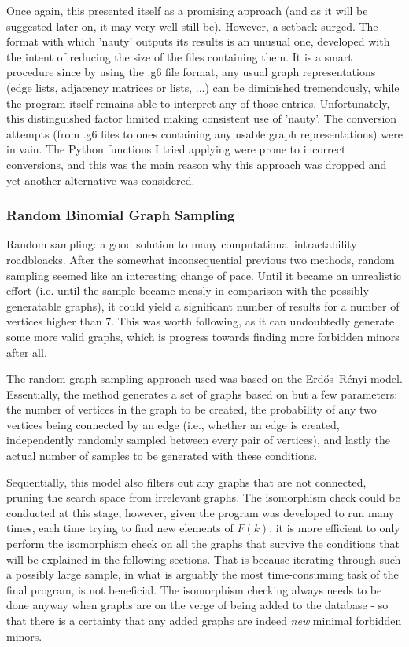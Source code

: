 Once again, this presented itself as a promising approach (and as it will be suggested later on, it may very well still be). However, a setback surged. The format with which 'nauty' outputs its results is an unusual one, developed with the intent of reducing the size of the files containing them. It is a smart procedure since by using the .g6 file format, any usual graph representations (edge lists, adjacency matrices or lists, ...) can be diminished tremendously, while the program itself remains able to interpret any of those entries. Unfortunately, this distinguished factor limited making consistent use of 'nauty'. The conversion attempts (from .g6 files to ones containing any usable graph representations) were in vain. The Python functions I tried applying were prone to incorrect conversions, and this was the main reason why this approach was dropped and yet another alternative was considered.

\subsubsection{Random Binomial Graph Sampling}
Random sampling: a good solution to many computational intractability roadbloacks. After the somewhat inconsequential previous two methods, random sampling seemed like an interesting change of pace. Until it became an unrealistic effort (i.e. until the sample became measly in comparison with the possibly generatable graphs), it could yield a significant number of results for a number of vertices higher than 7. This was worth following, as it can undoubtedly generate some more valid graphs, which is progress towards finding more forbidden minors after all.

The random graph sampling approach used was based on the Erdős–Rényi model. Essentially, the method generates a set of graphs based on but a few parameters: the number of vertices in the graph to be created, the probability of any two vertices being connected by an edge (i.e., whether an edge is created, independently randomly sampled between every pair of vertices), and lastly the actual number of samples to be generated with these conditions.

Sequentially, this model also filters out any graphs that are not connected, pruning the search space from irrelevant graphs. The isomorphism check could be conducted at this stage, however, given the program was developed to run many times, each time trying to find new elements of $F(k)$, it is more efficient to only perform the isomorphism check on all the graphs that survive the conditions that will be explained in the following sections. That is because iterating through such a possibly large sample, in what is arguably the most time-consuming task of the final program, is not beneficial. The isomorphism checking always needs to be done anyway when graphs are on the verge of being added to the database - so that there is a certainty that any added graphs are indeed \textit{new} minimal forbidden minors.

